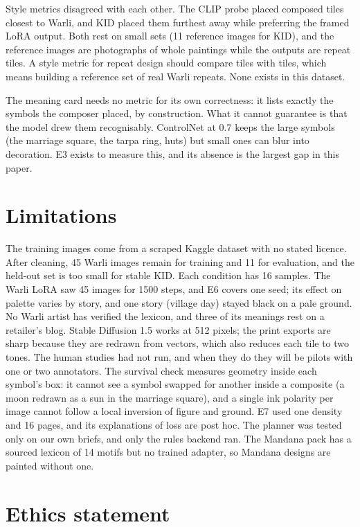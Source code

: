 \documentclass[conference]{IEEEtran}
\begin{document}
Style metrics disagreed with each other. The CLIP probe placed composed tiles closest to Warli, and KID placed them furthest away while preferring the framed LoRA output. Both rest on small sets (11 reference images for KID), and the reference images are photographs of whole paintings while the outputs are repeat tiles. A style metric for repeat design should compare tiles with tiles, which means building a reference set of real Warli repeats. None exists in this dataset.

The meaning card needs no metric for its own correctness: it lists exactly the symbols the composer placed, by construction. What it cannot guarantee is that the model drew them recognisably. ControlNet at 0.7 keeps the large symbols (the marriage square, the tarpa ring, huts) but small ones can blur into decoration. E3 exists to measure this, and its absence is the largest gap in this paper.

\section{Limitations}

The training images come from a scraped Kaggle dataset with no stated licence. After cleaning, 45 Warli images remain for training and 11 for evaluation, and the held-out set is too small for stable KID. Each condition has 16 samples. The Warli LoRA saw 45 images for 1500 steps, and E6 covers one seed; its effect on palette varies by story, and one story (village day) stayed black on a pale ground. No Warli artist has verified the lexicon, and three of its meanings rest on a retailer's blog. Stable Diffusion 1.5 works at 512 pixels; the print exports are sharp because they are redrawn from vectors, which also reduces each tile to two tones. The human studies had not run, and when they do they will be pilots with one or two annotators. The survival check measures geometry inside each symbol's box: it cannot see a symbol swapped for another inside a composite (a moon redrawn as a sun in the marriage square), and a single ink polarity per image cannot follow a local inversion of figure and ground. E7 used one density and 16 pages, and its explanations of loss are post hoc. The planner was tested only on our own briefs, and only the rules backend ran. The Mandana pack has a sourced lexicon of 14 motifs but no trained adapter, so Mandana designs are painted without one.

\section{Ethics statement}
\end{document}
